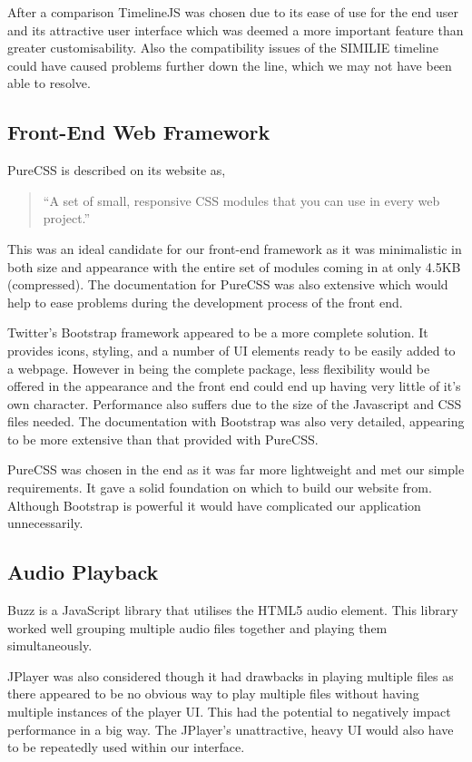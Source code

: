\documentclass{l3proj}
\begin{document}
After a comparison TimelineJS was chosen due to its ease of use for the end user and its attractive user interface which was deemed a more important feature than greater customisability. Also the compatibility issues of the SIMILIE timeline could have caused problems further down the line, which we may not have been able to resolve.


\subsection{Front-End Web Framework}

PureCSS is described on its website as,

\blockquote{“A set of small, responsive CSS modules that you can use in every web project.”}

This was an ideal candidate for our front-end framework as it was minimalistic in both size and appearance with the entire set of modules coming in at only 4.5KB (compressed). The documentation for PureCSS was also extensive which would help to ease problems during the development process of the front end.

Twitter's Bootstrap framework appeared to be a more complete solution. It provides icons, styling, and a number of UI elements ready to be easily added to a webpage. However in being the complete package, less flexibility would be offered in the appearance and the front end could end up having very little of it's own character. Performance also suffers due to the size of the Javascript and CSS files needed. The documentation with Bootstrap was also very detailed, appearing to be more extensive than that provided with PureCSS.

PureCSS was chosen in the end as it was far more lightweight and met our simple requirements. It gave a solid foundation on which to build our website from. Although Bootstrap is powerful it would have complicated our application unnecessarily.


\subsection{Audio Playback}

Buzz is a JavaScript library that utilises the HTML5 audio element. This library worked well grouping multiple audio files together and playing them simultaneously.

JPlayer was also considered though it had drawbacks in playing multiple files as there appeared to be no obvious way to play multiple files without having multiple instances of the player UI. This had the potential to negatively impact performance in a big way. The JPlayer's unattractive, heavy UI would also have to be repeatedly used within our interface.
\end{document}
